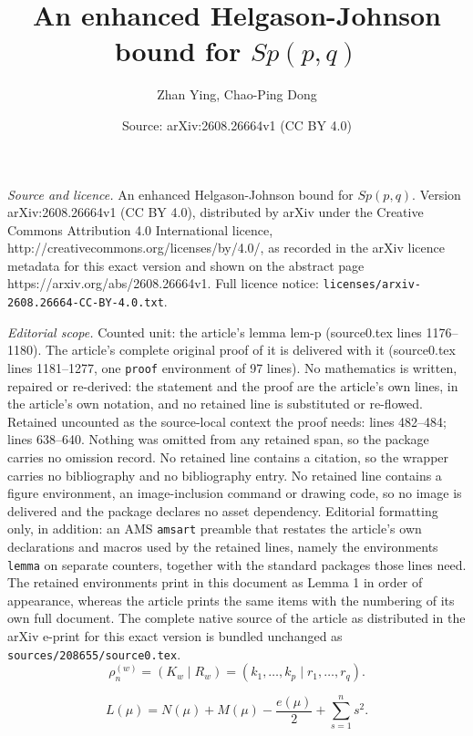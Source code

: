 \documentclass[10pt,a4paper]{amsart}
\title{An enhanced Helgason-Johnson bound for $Sp(p, q)$}
\author{Zhan Ying, Chao-Ping Dong}
\date{Source: arXiv:2608.26664v1 (CC BY 4.0)}
\begin{document}
\maketitle

\noindent\emph{Source and licence.} An enhanced Helgason-Johnson bound for $Sp(p, q)$. Version arXiv:2608.26664v1 (CC BY 4.0), distributed by arXiv under the Creative Commons Attribution 4.0 International licence, http://creativecommons.org/licenses/by/4.0/, as recorded in the arXiv licence metadata for this exact version and shown on the abstract page https://arxiv.org/abs/2608.26664v1. Full licence notice: \texttt{licenses/arxiv-2608.26664-CC-BY-4.0.txt}.\par\smallskip

\noindent\textit{Editorial scope.} Counted unit: the article's lemma lem-p (source0.tex lines 1176--1180). The article's complete original proof of it is delivered with it (source0.tex lines 1181--1277, one \texttt{proof} environment of 97 lines). No mathematics is written, repaired or re-derived: the statement and the proof are the article's own lines, in the article's own notation, and no retained line is substituted or re-flowed.  Retained uncounted as the source-local context the proof needs: lines 482--484; lines 638--640.  Nothing was omitted from any retained span, so the package carries no omission record.  No retained line contains a citation, so the wrapper carries no bibliography and no bibliography entry.  No retained line contains a figure environment, an image-inclusion command or drawing code, so no image is delivered and the package declares no asset dependency.  Editorial formatting only, in addition: an AMS \texttt{amsart} preamble that restates the article's own declarations and macros used by the retained lines, namely the environments \texttt{lemma} on separate counters, together with the standard packages those lines need.  The retained environments print in this document as Lemma 1 in order of appearance, whereas the article prints the same items with the numbering of its own full document.  The complete native source of the article as distributed in the arXiv e-print for this exact version is bundled unchanged as \texttt{sources/208655/source0.tex}.
\begin{equation}\label{rho-n-w}
\rho_n^{(w)}=(K_w\mid R_w)=(k_1,\dots,k_p\mid r_1,\dots,r_q).
\end{equation}

 \begin{equation}\label{L-N-M}
L(\mu)=N(\mu)+M(\mu)-\dfrac{e(\mu)}{2}+\sum_{s=1}^n s^2.
\end{equation}
\end{document}
